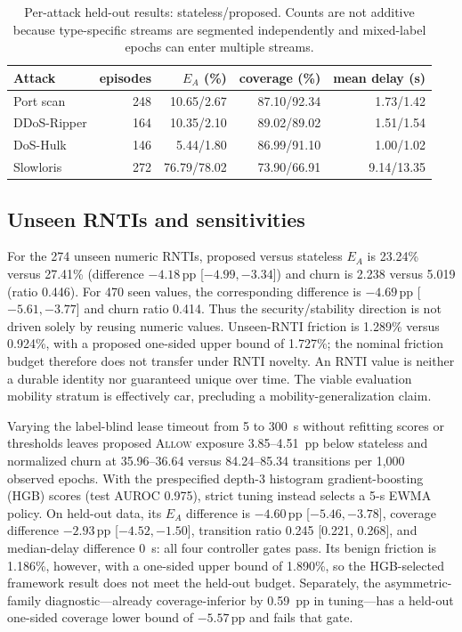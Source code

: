 \documentclass[journal,10pt]{IEEEtran}
\newcommand{\Allow}{\textsc{Allow}}
\newcommand{\pp}{\,\mathrm{pp}}
\begin{document}
\begin{table}[t]
\caption{Per-attack held-out results: stateless/proposed. Counts are not additive because type-specific streams are segmented independently and mixed-label epochs can enter multiple streams.}
\label{tab:attack}
\centering
\scriptsize
\setlength{\tabcolsep}{3.0pt}
\begin{tabular}{@{}lrrrr@{}}
\toprule
Attack & episodes & $E_A$ (\%) & coverage (\%) & mean delay (s) \\
\midrule
Port scan   & 248 & 10.65/2.67 & 87.10/92.34 & 1.73/1.42 \\
DDoS-Ripper & 164 & 10.35/2.10 & 89.02/89.02 & 1.51/1.54 \\
DoS-Hulk    & 146 &  5.44/1.80 & 86.99/91.10 & 1.00/1.02 \\
Slowloris   & 272 & 76.79/78.02 & 73.90/66.91 & 9.14/13.35 \\
\bottomrule
\end{tabular}
\end{table}

\subsection{Unseen RNTIs and sensitivities}
For the 274 unseen numeric RNTIs, proposed versus stateless $E_A$ is 23.24\% versus 27.41\% (difference $-4.18\pp$ [${-4.99},{-3.34}$]) and churn is 2.238 versus 5.019 (ratio 0.446). For 470 seen values, the corresponding difference is $-4.69\pp$ [${-5.61},{-3.77}$] and churn ratio 0.414. Thus the security/stability direction is not driven solely by reusing numeric values. Unseen-RNTI friction is 1.289\% versus 0.924\%, with a proposed one-sided upper bound of 1.727\%; the nominal friction budget therefore does not transfer under RNTI novelty. An RNTI value is neither a durable identity nor guaranteed unique over time. The viable evaluation mobility stratum is effectively car, precluding a mobility-generalization claim.

Varying the label-blind lease timeout from 5 to 300~s without refitting scores or thresholds leaves proposed \Allow{} exposure 3.85--4.51~pp below stateless and normalized churn at 35.96--36.64 versus 84.24--85.34 transitions per 1,000 observed epochs. With the prespecified depth-3 histogram gradient-boosting (HGB) scores (test AUROC 0.975), strict tuning instead selects a 5-s EWMA policy. On held-out data, its $E_A$ difference is $-4.60\pp$ [${-5.46},{-3.78}$], coverage difference $-2.93\pp$ [${-4.52},{-1.50}$], transition ratio 0.245 [0.221, 0.268], and median-delay difference 0~s: all four controller gates pass. Its benign friction is 1.186\%, however, with a one-sided upper bound of 1.890\%, so the HGB-selected framework result does not meet the held-out budget. Separately, the asymmetric-family diagnostic---already coverage-inferior by 0.59~pp in tuning---has a held-out one-sided coverage lower bound of $-5.57\pp$ and fails that gate.
\end{document}
